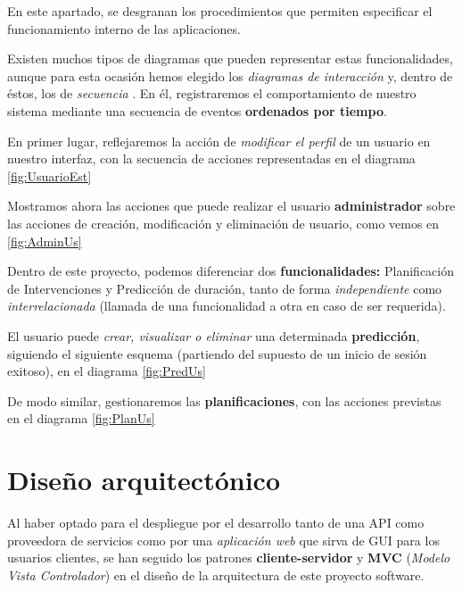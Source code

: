 En este apartado, se desgranan los procedimientos que permiten especificar el funcionamiento interno de las aplicaciones.

Existen muchos tipos de diagramas que pueden representar estas funcionalidades, aunque para esta ocasión hemos elegido los \textit{diagramas de interacción} y, dentro de éstos, los de \textit{secuencia}  \cite{Britton2005IdentifyingDiagrams}. En él, registraremos el comportamiento de nuestro sistema mediante una secuencia de eventos \textbf{ordenados por tiempo}.

En primer lugar, reflejaremos la acción de \textit{modificar el perfil} de un usuario en nuestro interfaz, con la secuencia de acciones representadas en el diagrama \ref{fig:UsuarioEst}


Mostramos ahora las acciones que puede realizar el usuario \textbf{administrador} sobre las acciones de creación, modificación y eliminación de usuario, como vemos en \ref{fig:AdminUs}


Dentro de este proyecto, podemos diferenciar dos \textbf{funcionalidades:} Planificación de Intervenciones y Predicción de duración, tanto de forma \textit{independiente} como \textit{interrelacionada} (llamada de una funcionalidad a otra en caso de ser requerida).

El usuario puede \textit{crear, visualizar o eliminar} una determinada \textbf{predicción}, siguiendo el siguiente esquema (partiendo del supuesto de un inicio de sesión exitoso), en el diagrama \ref{fig:PredUs}


De modo similar, gestionaremos las \textbf{planificaciones}, con las acciones previstas en el diagrama \ref{fig:PlanUs}




\section{Diseño arquitectónico}

Al haber optado para el despliegue por el desarrollo tanto de una API como proveedora de servicios como por una \textit{aplicación web} que sirva de GUI para los usuarios clientes, se han seguido los patrones \textbf{cliente-servidor} y \textbf{MVC} (\textit{Modelo Vista Controlador}) en el diseño de la arquitectura de este proyecto software.


